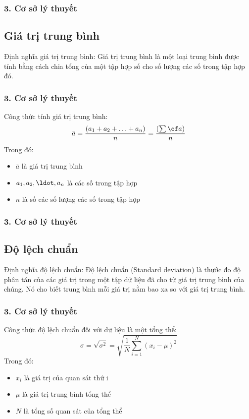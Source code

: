 \documentclass[english,10pt,table]{beamer}
\begin{document}
\begin{frame}
\frametitle{3. Cơ sở lý thuyết}
\subsection{Giá trị trung bình}
\begin{block}
{Định nghĩa giá trị trung bình:} 
Giá trị trung bình là một loại trung bình được tính bằng cách chia tổng của một tập hợp số cho số lượng các số trong tập hợp đó.
\end{block}
\end{frame}

\begin{frame}
\frametitle{3. Cơ sở lý thuyết}
\begin{block}
{Công thức tính giá trị trung bình:} 
$$\bar{a} = \frac{(a_1+a_2+\ldots+a_n)}{n}= \frac{(\sum\of a)}{n}$$
Trong đó: 
\begin{itemize}
    \item 	$\bar{a}$ là giá trị trung bình
    \item 	$a_1, a_2,\ldot, a_n$ là các số trong tập hợp
    \item 	$n$ là số các số lượng các số trong tập hợp
\end{itemize}
\end{block}
\end{frame}

\begin{frame}
\frametitle{3. Cơ sở lý thuyết}
\subsection{Độ lệch chuẩn}
\begin{block}
{Định nghĩa độ lệch chuẩn:} 
Độ lệch chuẩn (Standard deviation) là thước đo độ phân tán của các giá trị trong một tập dữ liệu đã cho từ giá trị trung bình của chúng. Nó cho biết trung bình mỗi giá trị nằm bao xa so với giá trị trung bình.
\end{block}
\end{frame}

\begin{frame}
\frametitle{3. Cơ sở lý thuyết}
\begin{block}
{Công thức độ lệch chuẩn đối với dữ liệu là một tổng thể:} 
$$
\sigma=\sqrt{\sigma^{2}}=\sqrt{\frac{1}{N} \sum_{i=1}^{N}\left(x_{i}-\mu\right)^{2}}
$$
Trong đó: 
\begin{itemize}
    \item $x_{i}$ là giá trị của quan sát thứ i
    \item $\mu$ là giá trị trung bình tổng thể
    \item $N$ là tổng số quan sát của tổng thể
\end{itemize}
\end{block}
\end{frame}
\end{document}
